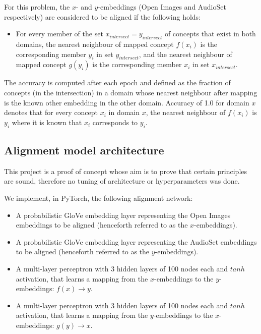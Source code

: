 For this problem, the $x$- and $y$-embeddings (Open Images and AudioSet respectively) are considered to be aligned if the following holds:

\begin{itemize}
    \item For every member of the set $x_{intersect} = y_{intersect}$ of concepts that exist in both domains, the nearest neighbour of mapped concept $f(x_i)$ is the corresponding member $y_i$ in set $y_{intersect}$, and the nearest neighbour of mapped concept $g(y_i)$ is the corresponding member $x_i$ in set $x_{intersect}$. 
\end{itemize}

The accuracy is computed after each epoch and defined as the fraction of concepts (in the intersection) in a domain whose nearest neighbour after mapping is the known other embedding in the other domain. Accuracy of 1.0 for domain $x$ denotes that for every concept $x_i$ in domain $x$, the nearest neighbour of $f(x_i)$ is $y_i$ where it is known that $x_i$ corresponds to $y_i$. 

\subsection{Alignment model architecture}

This project is a proof of concept whose aim is to prove that certain principles are sound, therefore no tuning of architecture or hyperparameters was done. 

We implement, in PyTorch, the following alignment network: 

\begin{itemize}
    \item A probabilistic GloVe embedding layer representing the Open Images embeddings to be aligned (henceforth referred to as the $x$-embeddings). 
    \item A probabilistic GloVe embedding layer representing the AudioSet embeddings to be aligned (henceforth referred to as the $y$-embeddings). 
    \item A multi-layer perceptron \cite{mlp} with 3 hidden layers of 100 nodes each and $tanh$ activation, that learns a mapping from the $x$-embeddings to the $y$-embeddings: $f(x) \rightarrow y$.
    \item A multi-layer perceptron \cite{mlp} with 3 hidden layers of 100 nodes each and $tanh$ activation, that learns a mapping from the $y$-embeddings to the $x$-embeddings: $g(y) \rightarrow x$.
\end{itemize}

